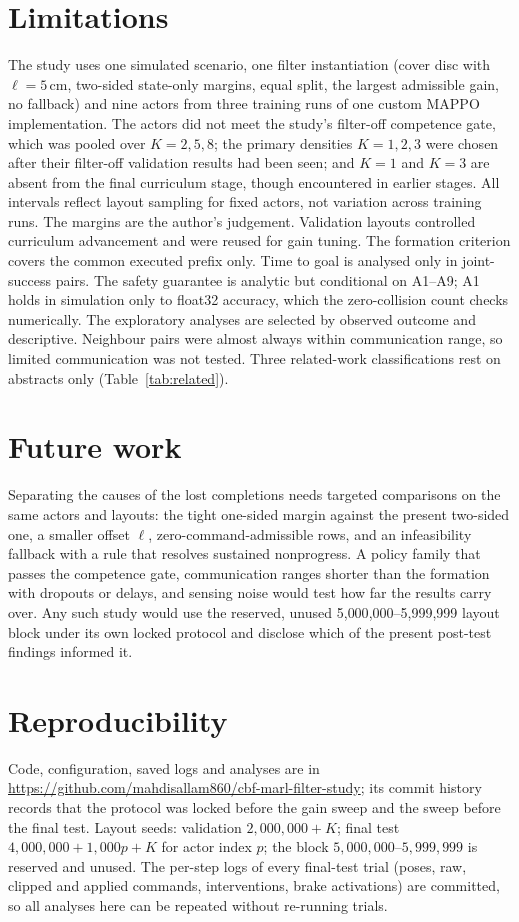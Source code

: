 \documentclass[journal]{IEEEtran}
\begin{document}
\section{Limitations}
The study uses one simulated scenario, one filter instantiation (cover disc with $\ell=5$\,cm,
two-sided state-only margins, equal split, the largest admissible gain, no fallback) and nine actors from
three training runs of one custom MAPPO implementation. The actors did not meet the study's filter-off
competence gate, which was pooled over $K=2,5,8$; the primary densities $K=1,2,3$ were chosen after
their filter-off validation results had been seen; and $K=1$ and $K=3$ are absent from the final
curriculum stage, though encountered in earlier stages. All intervals reflect layout sampling
for fixed actors, not variation across training runs. The margins are the author's judgement.
Validation layouts controlled curriculum advancement and were reused for gain tuning. The formation
criterion covers the common executed prefix only. Time to goal is analysed only in joint-success pairs.
The safety guarantee is analytic but conditional on A1--A9; A1 holds in simulation only to float32
accuracy, which the zero-collision count checks numerically. The exploratory analyses are selected by
observed outcome and descriptive.
Neighbour pairs were almost always within communication range, so limited communication was not
tested. Three related-work classifications rest on abstracts only (Table~\ref{tab:related}).

\section{Future work}
Separating the causes of the lost completions needs targeted comparisons on the same actors and
layouts: the tight one-sided margin against the present two-sided one, a smaller offset $\ell$,
zero-command-admissible rows, and an infeasibility fallback with a rule that resolves sustained
nonprogress. A policy family that passes the competence gate, communication ranges shorter than the
formation with dropouts or delays, and sensing noise would test how far the results carry over. Any such study would use the reserved, unused
5{,}000{,}000--5{,}999{,}999 layout block under its own locked protocol and disclose which of the
present post-test findings informed it.

\section{Reproducibility}
{\sloppy Code, configuration, saved logs and analyses are in \url{https://github.com/mahdisallam860/cbf-marl-filter-study}; its commit history records that the
protocol was locked before the gain sweep and the sweep before the final test. Layout seeds: validation $2{,}000{,}000+K$; final test
$4{,}000{,}000+1{,}000p+K$ for actor index $p$; the block $5{,}000{,}000$--$5{,}999{,}999$ is reserved and
unused. The per-step logs of every final-test trial (poses, raw, clipped and applied commands,
interventions, brake activations) are committed, so all analyses here can be repeated without
re-running trials.\par}
\end{document}
